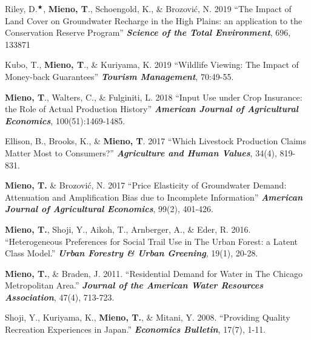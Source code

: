 \documentclass[10pt,margin,line]{res}
\newenvironment{list1}{
  \begin{list}{\ding{113}}{%
      \setlength{\itemsep}{0in}
      \setlength{\parsep}{0in} \setlength{\parskip}{0in}
      \setlength{\topsep}{0in} \setlength{\partopsep}{0in}
      \setlength{\leftmargin}{0.17in}}}{\end{list}}
\begin{document}
\begin{resume}
\begin{list1}
\item[] Riley, D.$^\bigstar$, \textbf{Mieno, T}., Schoengold, K., \& Brozovi\'{c}, N. 2019
  ``The Impact of Land Cover on Groundwater Recharge in the High Plains: an application to the Conservation Reserve Program'' \textbf{\textit{Science of the Total Environment}}, 696, 133871
\vspace*{0.3cm}

\item[] Kubo, T., \textbf{Mieno, T}., \& Kuriyama, K. 2019 ``Wildlife Viewing: The Impact of Money-back Guarantees'' \textbf{\textit{Tourism Management}}, 70:49-55.
\vspace*{0.3cm}

\item[] \textbf{Mieno, T}., Walters, C., \& Fulginiti, L. 2018 ``Input Use under Crop Insurance: the Role of Actual Production History'' \textbf{\textit{American Journal of Agricultural Economics}}, 100(51):1469-1485.
\vspace*{0.3cm}

\item[] Ellison, B., Brooks, K., \& \textbf{Mieno, T}. 2017 ``Which Livestock Production Claims Matter Most to Consumers?'' \textbf{\textit{Agriculture and Human Values}}, 34(4), 819-831.
\vspace*{0.3cm}

\item[] \textbf{Mieno, T.} \& Brozovi\'{c}, N. 2017 ``Price Elasticity of Groundwater Demand: Attenuation and Amplification Bias due to Incomplete Information'' \textbf{\textit{American Journal of Agricultural Economics}}, 99(2), 401-426.
\vspace*{0.3cm}

\item[] \textbf{Mieno, T.}, Shoji, Y., Aikoh, T., Arnberger, A., \& Eder, R. 2016. ``Heterogeneous Preferences for Social Trail Use in The Urban Forest: a Latent Class Model.'' \textbf{\textit{Urban Forestry \& Urban Greening}}, 19(1), 20-28.
\vspace*{0.3cm}

\item[] \textbf{Mieno, T.}, \& Braden, J. 2011. ``Residential Demand for Water in The Chicago Metropolitan Area.'' \textbf{\textit{Journal of the American Water Resources Association}}, 47(4), 713-723.
\vspace*{0.3cm}

\item[] Shoji, Y., Kuriyama, K., \textbf{Mieno, T.}, \& Mitani, Y. 2008. ``Providing Quality Recreation Experiences in Japan.'' \textbf{\textit{Economics Bulletin}}, 17(7), 1-11.
\vspace*{0.3cm}


\end{list1}
\end{resume}
\end{document}
